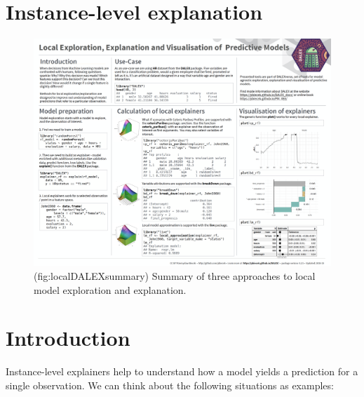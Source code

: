 \documentclass[12pt,]{krantz}
\theoremstyle{definition}
\theoremstyle{definition}
\theoremstyle{definition}
\theoremstyle{remark}
\begin{document}
\hypertarget{instance-level-explanation}{%
\section*{Instance-level explanation}\label{instance-level-explanation}}

\begin{figure}

{\centering \includegraphics[width=0.99\linewidth]{figure/DALEX_local} 

}

\caption{(fig:localDALEXsummary) Summary of three approaches to local model exploration and explanation.}\label{fig:localDALEXsummary}
\end{figure}

\hypertarget{PredictionExplainers}{%
\section{Introduction}\label{PredictionExplainers}}

Instance-level explainers help to understand how a model yields a
prediction for a single observation. We can think about the following
situations as examples:
\end{document}
